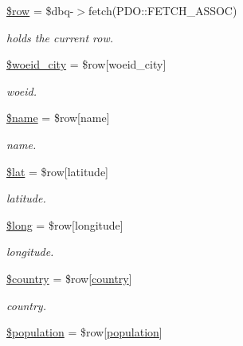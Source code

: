\begin{DoxyCompactItemize}
\mbox{\hyperlink{rotterdam_2index_8php_aa1d731aa570613e5bcff831bb10e9b87}{\$row}} = \$dbq-\/$>$fetch(P\+D\+O\+::\+F\+E\+T\+C\+H\+\_\+\+A\+S\+S\+OC)
\begin{DoxyCompactList}\small\item\em holds the current row. \end{DoxyCompactList}\item 
\mbox{\hyperlink{rotterdam_2index_8php_a34dc977e0c4838f8c2d423849ad9ff02}{\$woeid\+\_\+city}} = \$row\mbox{[}\textquotesingle{}woeid\+\_\+city\textquotesingle{}\mbox{]}
\begin{DoxyCompactList}\small\item\em woeid. \end{DoxyCompactList}\item 
\mbox{\hyperlink{rotterdam_2index_8php_ab2fc40d43824ea3e1ce5d86dee0d763b}{\$name}} = \$row\mbox{[}\textquotesingle{}name\textquotesingle{}\mbox{]}
\begin{DoxyCompactList}\small\item\em name. \end{DoxyCompactList}\item 
\mbox{\hyperlink{rotterdam_2index_8php_af498b42b83afed4dfe0af05fd802776c}{\$lat}} = \$row\mbox{[}\textquotesingle{}latitude\textquotesingle{}\mbox{]}
\begin{DoxyCompactList}\small\item\em latitude. \end{DoxyCompactList}\item 
\mbox{\hyperlink{rotterdam_2index_8php_a30223182013e2964ccbd7c134b3c52c1}{\$long}} = \$row\mbox{[}\textquotesingle{}longitude\textquotesingle{}\mbox{]}
\begin{DoxyCompactList}\small\item\em longitude. \end{DoxyCompactList}\item 
\mbox{\hyperlink{rotterdam_2index_8php_a1437a5f6eb157f0eb267a26e0ad4f1ba}{\$country}} = \$row\mbox{[}\textquotesingle{}\mbox{\hyperlink{index_8php_a0f0752705301c982dc8994ebc993e6e9}{country}}\textquotesingle{}\mbox{]}
\begin{DoxyCompactList}\small\item\em country. \end{DoxyCompactList}\item 
\mbox{\hyperlink{rotterdam_2index_8php_afc1939ed7d0e8629546e2bc27b02dbc1}{\$population}} = \$row\mbox{[}\textquotesingle{}\mbox{\hyperlink{index_8php_aa78fa356925cd3f67d485c4d6846202b}{population}}\textquotesingle{}\mbox{]}

\end{DoxyCompactItemize}
